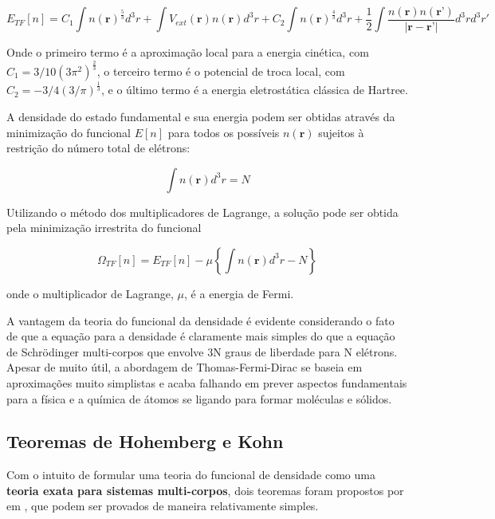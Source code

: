 			\begin{equation}
				E_{TF}[n] = C_1 \int n(\textbf{r})^{\frac{5}{3}} d^3r + \int V_{ext}(\textbf{r})n(\textbf{r}) d^3r + C_2 \int n(\textbf{r})^{\frac{4}{3}} d^3r + \frac{1}{2}\int \frac{n(\textbf{r})n(\textbf{r'})}{|\textbf{r} - \textbf{r'}|} d^3rd^3r'
			\end{equation}
		
			Onde o primeiro termo é a aproximação local para a energia cinética, com $C_1 = 3/10(3\pi^2)^\frac{2}{3}$, o terceiro termo é o potencial de troca local, com $C_2 = -3/4(3/\pi)^\frac{1}{3}$, e o último termo é a energia eletrostática clássica de Hartree. 
			
			A densidade do estado fundamental e sua energia podem ser obtidas através da minimização do funcional $E[n]$ para todos os possíveis $n(\textbf{r})$ sujeitos à restrição do número total de elétrons:
			
			\begin{equation}
				\int n(\textbf{r}) d^3r = N
			\end{equation}
			
			Utilizando o método dos multiplicadores de Lagrange, a solução pode ser obtida pela minimização irrestrita do funcional 
			
			\begin{equation}
				\Omega_{TF}[n] = E_{TF}[n] - \mu \left\{ \int n(\textbf{r}) d^3r - N \right\}
			\end{equation}
			
			onde o multiplicador de Lagrange, $\mu$, é a energia de Fermi. 
			
			A vantagem da teoria do funcional da densidade é evidente considerando o fato de que a equação para a densidade é claramente mais simples do que a equação de Schrödinger multi-corpos que envolve 3N graus de liberdade para N elétrons. Apesar de muito útil, a abordagem de Thomas-Fermi-Dirac se baseia em aproximações muito simplistas e acaba falhando em prever aspectos fundamentais para a física e a química de átomos se ligando para formar moléculas e sólidos. 
			
	\subsection{Teoremas de Hohemberg e Kohn}
	
		Com o intuito de formular uma teoria do funcional de densidade como uma \textbf{teoria exata para sistemas multi-corpos}, dois teoremas foram propostos por  em \citeyear{hohenberg1964inhomogeneous} \cite{hohenberg1964inhomogeneous}, que podem ser provados de maneira relativamente simples. 
	
